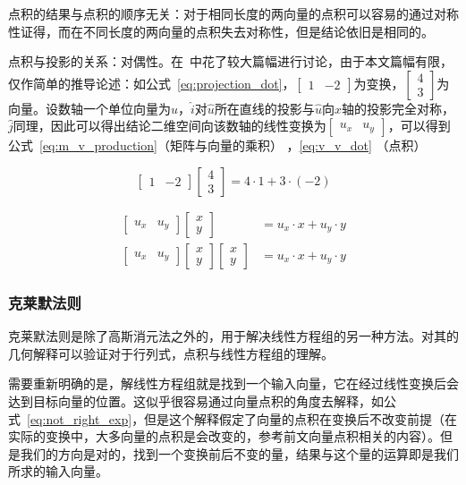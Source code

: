 \documentclass[UTF8]{ctexart}
\newcommand{\mat}[1]{\begin{bmatrix} #1 \end{bmatrix}}
\begin{document}
点积的结果与点积的顺序无关：对于相同长度的两向量的点积可以容易的通过对称性证得，而在不同长度的两向量的点积失去对称性，但是结论依旧是相同的。

点积与投影的关系：对偶性。在~\cite{Essenceoflinearalgebra}中花了较大篇幅进行讨论，由于本文篇幅有限，仅作简单的推导论述：如公式~\ref{eq:projection_dot}，$\begin{bmatrix}1 & -2\end{bmatrix}$为变换，$\begin{bmatrix}4 \\3\end{bmatrix}$为向量。设数轴一个单位向量为$\hat{u}$，$\hat{i}$对$\hat{u}$所在直线的投影与$\hat{u}$向$x$轴的投影完全对称，$\hat{j}$同理，因此可以得出结论二维空间向该数轴的线性变换为$\begin{bmatrix}u_x & u_y\end{bmatrix}$，可以得到公式~\eqref{eq:m_v_production}（矩阵与向量的乘积） ，\eqref{eq:v_v_dot} （点积）

\begin{equation}
    \label{eq:projection_dot}
    \begin{bmatrix}1 & -2\end{bmatrix}\begin{bmatrix}4 \\3\end{bmatrix} = 4 \cdot 1 + 3 \cdot (-2)
\end{equation}

\begin{align}
    \mat{u_x & u_y}\mat{x\\y} &= u_x \cdot x + u_y \cdot y \label{eq:m_v_production} \\
    \mat{u_x & u_y}\mat{x\\y}\mat{x\\y} &= u_x \cdot x + u_y \cdot y  \label{eq:v_v_dot} 
\end{align}

\subsubsection{克莱默法则}
克莱默法则是除了高斯消元法之外的，用于解决线性方程组的另一种方法。对其的几何解释可以验证对于行列式，点积与线性方程组的理解。

需要重新明确的是，解线性方程组就是找到一个输入向量，它在经过线性变换后会达到目标向量的位置。这似乎很容易通过向量点积的角度去解释，如公式~\eqref{eq:not_right_exp}，但是这个解释假定了向量的点积在变换后不改变前提（在实际的变换中，大多向量的点积是会改变的，参考前文向量点积相关的内容）。但是我们的方向是对的，找到一个变换前后不变的量，结果与这个量的运算即是我们所求的输入向量。
\end{document}
